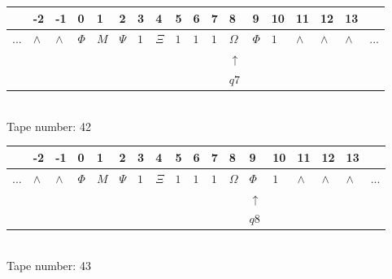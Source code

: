 \documentclass[11pt]{article}
\begin{document}
\begin{table}[H]
\centering
\begin{tabular}{llllllllllllllllll}
 & -2 & -1 & 0 & 1 & 2 & 3 & 4 & 5 & 6 & 7 & 8 & 9 & 10 & 11 & 12 & 13 & \\
\hline
$...$ & \multicolumn{1}{|l|}{$\wedge$} & \multicolumn{1}{|l|}{$\wedge$} & \multicolumn{1}{|l|}{$\Phi$} & \multicolumn{1}{|l|}{$M$} & \multicolumn{1}{|l|}{$\Psi$} & \multicolumn{1}{|l|}{$1$} & \multicolumn{1}{|l|}{$\Xi$} & \multicolumn{1}{|l|}{$1$} & \multicolumn{1}{|l|}{$1$} & \multicolumn{1}{|l|}{$1$} & \multicolumn{1}{|l|}{$\Omega$} & \multicolumn{1}{|l|}{$\Phi$} & \multicolumn{1}{|l|}{$1$} & \multicolumn{1}{|l|}{$\wedge$} & \multicolumn{1}{|l|}{$\wedge$} & \multicolumn{1}{|l|}{$\wedge$} & $...$\\
\hline
&  &  &  &  &  &  &  &  &  &  & $\uparrow$ &  &  &  &  &  &  \\
&  &  &  &  &  &  &  &  &  &  & $ q7 $ &  &  &  &  &  &  \\
\end{tabular}
\\
Tape number: 42
\noindent\makebox[\linewidth]{\hdashrule{\textwidth}{1pt}{1pt}}\end{table}

\begin{table}[H]
\centering
\begin{tabular}{llllllllllllllllll}
 & -2 & -1 & 0 & 1 & 2 & 3 & 4 & 5 & 6 & 7 & 8 & 9 & 10 & 11 & 12 & 13 & \\
\hline
$...$ & \multicolumn{1}{|l|}{$\wedge$} & \multicolumn{1}{|l|}{$\wedge$} & \multicolumn{1}{|l|}{$\Phi$} & \multicolumn{1}{|l|}{$M$} & \multicolumn{1}{|l|}{$\Psi$} & \multicolumn{1}{|l|}{$1$} & \multicolumn{1}{|l|}{$\Xi$} & \multicolumn{1}{|l|}{$1$} & \multicolumn{1}{|l|}{$1$} & \multicolumn{1}{|l|}{$1$} & \multicolumn{1}{|l|}{$\Omega$} & \multicolumn{1}{|l|}{$\Phi$} & \multicolumn{1}{|l|}{$1$} & \multicolumn{1}{|l|}{$\wedge$} & \multicolumn{1}{|l|}{$\wedge$} & \multicolumn{1}{|l|}{$\wedge$} & $...$\\
\hline
&  &  &  &  &  &  &  &  &  &  &  & $\uparrow$ &  &  &  &  &  \\
&  &  &  &  &  &  &  &  &  &  &  & $ q8 $ &  &  &  &  &  \\
\end{tabular}
\\
Tape number: 43
\noindent\makebox[\linewidth]{\hdashrule{\textwidth}{1pt}{1pt}}\end{table}
\end{document}
